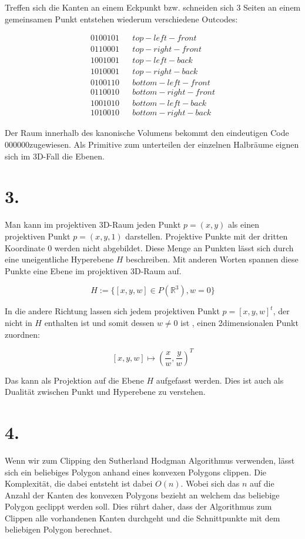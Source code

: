 \documentclass[12pt]{scrreprt}
\begin{document}
Treffen sich die Kanten an einem Eckpunkt bzw. schneiden sich 3 Seiten an einem gemeinsamen Punkt entstehen wiederum verschiedene Outcodes:

\begin{align*}
	0100101& &top-left-front\\
	0110001& &top-right-front\\
	1001001& &top-left-back\\
	1010001& &top-right-back\\
	0100110& &bottom-left-front\\
	0110010& &bottom-right-front\\
	1001010& &bottom-left-back\\
	1010010& &bottom-right-back
\end{align*}

Der Raum innerhalb des kanonische Volumens bekommt den eindeutigen Code $000000$zugewiesen. Als Primitive zum unterteilen der einzelnen Halbräume eignen sich im 3D-Fall die Ebenen.

\section*{3.}
Man kann im projektiven 3D-Raum jeden Punkt $p = (x,y)$ als einen projektiven Punkt $p = (x,y,1)$ darstellen. Projektive Punkte mit der dritten Koordinate 0 werden nicht abgebildet. Diese Menge an Punkten lässt sich durch eine uneigentliche Hyperebene $H$ beschreiben. Mit anderen Worten spannen diese Punkte eine Ebene im projektiven 3D-Raum auf.

\[
	H := \{ [x,y,w] \in P(\mathbb{R}^3), w = 0\}
\]

In die andere Richtung lassen sich jedem projektiven Punkt $p=[x,y,w]^t$, der nicht in $H$ enthalten ist und somit dessen $w \not = 0$ ist , einen 2dimensionalen Punkt zuordnen:

\[
	[x, y, w] \mapsto (\frac{x}{w},\frac{y}{w})^T
\]

Das kann als Projektion auf die Ebene $H$ aufgefasst werden. Dies ist auch als Dualität zwischen Punkt und Hyperebene zu verstehen.
\section*{4.}
Wenn wir zum Clipping den Sutherland Hodgman Algorithmus verwenden, lässt sich ein beliebiges Polygon anhand eines konvexen Polygons clippen. Die Komplexität, die dabei entsteht ist dabei $O(n)$. Wobei sich das $n$ auf die Anzahl der Kanten des konvexen Polygons bezieht an welchem das beliebige Polygon geclippt werden soll. Dies rührt daher, dass der Algorithmus zum Clippen alle vorhandenen Kanten durchgeht und die Schnittpunkte mit dem beliebigen Polygon berechnet.
\end{document}

